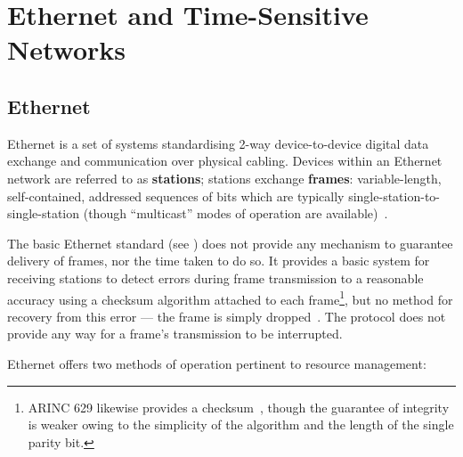 \section{Ethernet and Time-Sensitive Networks}

\subsection{Ethernet}

%

Ethernet is a set of systems standardising 2-way device-to-device digital data exchange and communication over physical cabling.
Devices within an Ethernet network are referred to as \textbf{stations}; stations exchange \textbf{frames}: variable-length, self-contained, addressed sequences of bits which are typically single-station-to-single-station (though ``multicast'' modes of operation are available)~\cite{IEEEStandardEthernet2022}\cite{spurgeonEthernetDefinitiveGuide2000}.

The basic Ethernet standard (see \cite{IEEEStandardEthernet2022}) does not provide any mechanism to guarantee delivery of frames, nor the time taken to do so.
It provides a basic system for receiving stations to detect errors during frame transmission to a reasonable accuracy using a checksum algorithm attached to each frame\footnote{ARINC 629 likewise provides a checksum~\cite{dheerajpuniaARINC629Digital2021}, though the guarantee of integrity is weaker owing to the simplicity of the algorithm and the length of the single parity bit.}, but no method for recovery from this error --- the frame is simply dropped~\cite{odomCCNA200301Official2019}.
The protocol does not provide any way for a frame's transmission to be interrupted.

Ethernet offers two methods of operation pertinent to resource management:

